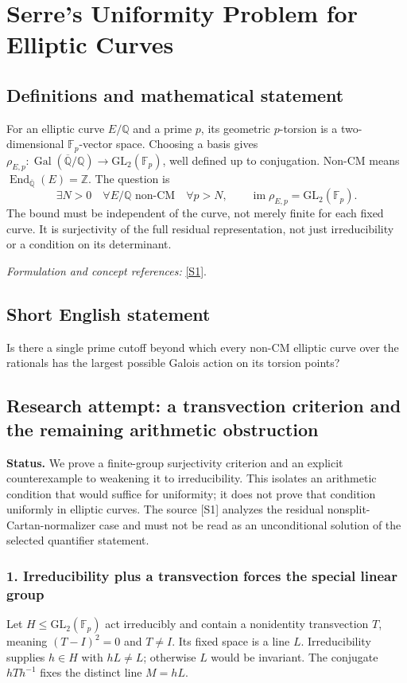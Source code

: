 \documentclass[11pt]{article}
\begin{document}
\section*{\texorpdfstring{Serre's Uniformity Problem for Elliptic Curves}{Serre's Uniformity Problem for Elliptic Curves}}\label{30002380}
\subsection{Definitions and mathematical statement}
For an elliptic curve $E/{\mathbb{Q}}$ and a prime $p$, its geometric $p$-torsion is a two-dimensional ${\mathbb{F}}_p$-vector space. Choosing a basis gives
$\rho_{E,p}:\operatorname{Gal}(\overline{{\mathbb{Q}}}/{\mathbb{Q}})\to\mathrm{GL}_2({\mathbb{F}}_p)$, well defined up to conjugation. Non-CM means $\operatorname{End}_{\overline{{\mathbb{Q}}}}(E)={\mathbb{Z}}$. The question is
\[
 \exists N>0\quad\forall E/{\mathbb{Q}}\text{ non-CM}\quad\forall p>N,
 \qquad\operatorname{im}\rho_{E,p}=\mathrm{GL}_2({\mathbb{F}}_p).
\]
The bound must be independent of the curve, not merely finite for each fixed curve. It is surjectivity of the full residual representation, not just irreducibility or a condition on its determinant.
\par\smallskip\textit{Formulation and concept references:} \href{https://arxiv.org/abs/2305.17780}{[S1]}.

\subsection{Short English statement}
Is there a single prime cutoff beyond which every non-CM elliptic curve over the rationals has the largest possible Galois action on its torsion points?
\subsection{Research attempt: a transvection criterion and the remaining arithmetic obstruction}
\textbf{Status.} We prove a finite-group surjectivity criterion and an explicit counterexample to weakening it to irreducibility. This isolates an arithmetic condition that would suffice for uniformity; it does not prove that condition uniformly in elliptic curves. The source [S1] analyzes the residual nonsplit-Cartan-normalizer case and must not be read as an unconditional solution of the selected quantifier statement.

\subsubsection{1. Irreducibility plus a transvection forces the special linear group}
Let $H\le\mathrm{GL}_2(\mathbb F_p)$ act irreducibly and contain a nonidentity transvection $T$, meaning $(T-I)^2=0$ and $T\ne I$. Its fixed space is a line $L$. Irreducibility supplies $h\in H$ with $hL\ne L$; otherwise $L$ would be invariant. The conjugate $hTh^{-1}$ fixes the distinct line $M=hL$.
\end{document}
